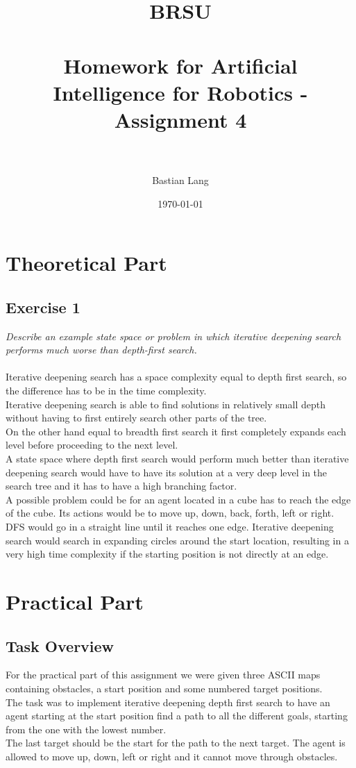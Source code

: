\documentclass[paper=a4, fontsize=11pt]{scrartcl} %
\title{	
\normalfont \normalsize 
\textsc{BRSU} \\ [25pt] %
\horrule{0.5pt} \\[0.4cm] %
\huge Homework for Artificial Intelligence for Robotics - Assignment 4 \\ %
\horrule{2pt} \\[0.5cm] %
}
\author{Bastian Lang} %
\date{\normalsize\today} %
\numberwithin{equation}{section} %
\numberwithin{figure}{section} %
\numberwithin{table}{section} %
\begin{document}
\maketitle %

\section{Theoretical Part}
\subsection{Exercise 1}
\emph{Describe an example state space or problem in which iterative deepening search performs
much worse than depth-first search.}\\\\

Iterative deepening search has a space complexity equal to depth first search, so the difference has to be in the time complexity.\\
Iterative deepening search is able to find solutions in relatively small depth without having to first entirely search other parts of the tree.\\
On the other hand equal to breadth first search it first completely expands each level before proceeding to the next level.\\
A state space where depth first search would perform much better than iterative deepening search would have to have its solution at a very deep level in the search tree and it has to have a high branching factor.\\
A possible problem could be for an agent located in a cube has to reach the edge of the cube. Its actions would be to move up, down, back, forth, left or right.\\
DFS would go in a straight line until it reaches one edge. Iterative deepening search would search in expanding circles around the start location, resulting in a very high time complexity if the starting position is not directly at an edge.



\section{Practical Part}
\subsection{Task Overview}
For the practical part of this assignment we were given three ASCII maps containing obstacles, a start position and some numbered target positions.\\
The task was to implement iterative deepening depth first search to have an agent starting at the start position find a path to all the different goals, starting from the one with the lowest number.\\
The last target should be the start for the path to the next target. The agent is allowed to move up, down, left or right and it cannot move through obstacles.\\
\end{document}
